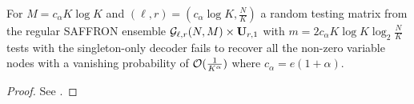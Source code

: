 \documentclass[conference,twocolumn]{IEEEtran}
\def\ceps{c_{\epsilon}}
\def\proofgap{-3ex}
\begin{document}
\begin{theorem}
For $M=c_\alpha K \log K$ and $(\ell,r)=(c_\alpha \log K,\frac{N}{K})$ a random testing matrix from the regular SAFFRON ensemble $\mathcal{G}_{\ell,r}(N,M)\times \mathbf{U}_{r,1}$ with $m=2c_\alpha K\log K \log_2 \frac{N}{K}$ tests with the singleton-only decoder fails to recover all the non-zero variable nodes with a vanishing probability of $\mathcal{O}(\frac{1}{K^{\alpha}})$ where $c_\alpha=e(1+\alpha)$.
%
\end{theorem}
\vspace{\proofgap}
\begin{proof}
See \cite{vem2017regular}.%
%
\end{proof}
\end{document}
